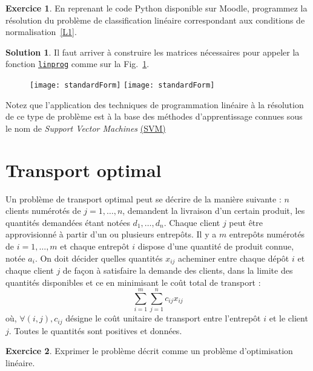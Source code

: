 \documentclass[a4paper,francais]{article}
\theoremstyle{definition}
\newtheorem{exercice}{Exercice}[section]
\newtheorem*{solution}{Solution}
\begin{document}
\begin{exercice}
  En reprenant le code Python disponible sur Moodle, programmez la résolution du problème
  de classification linéaire correspondant aux conditions de normalisation~\ref{L1}. 
\end{exercice}

\begin{solution}
  Il faut arriver à construire les matrices nécessaires pour appeler la fonction 
  \href{https://docs.scipy.org/doc/scipy-0.19.1/reference/optimize.linprog-simplex.html}{\texttt{linprog}} 
  comme sur la Fig.~\ref{fig:stdForm}. 
  
  \begin{figure}
  \centering
  \texttt{[image: standardForm]}
  \texttt{[image: standardForm]}
  \caption{}
  \label{fig:stdForm}
\end{figure}
\end{solution}

Notez que l'application des techniques de programmation linéaire à la résolution de ce type de problème
est à la base des méthodes d'apprentissage connues sous le nom de \emph{Support Vector Machines}
\href{https://en.wikipedia.org/wiki/Support-vector_machine}{(SVM)}

\section{Transport optimal}
\label{sec:transport}

Un problème de transport optimal peut se décrire de la manière suivante :
$n$ clients numérotés de $j = 1, \dots, n$, demandent la livraison d'un
certain produit, les quantités demandées étant notées $d_1, \dots, d_n$.
Chaque client $j$ peut être approvisionné à partir d'un ou plusieurs entrepôts.
Il y a $m$ entrepôts numérotés de $i = 1, \dots, m$ et chaque entrepôt $i$
dispose d'une quantité de produit connue, notée $a_i$. On doit décider quelles
quantités $x_{ij}$ acheminer entre chaque dépôt $i$ et chaque client $j$ de façon
à satisfaire la demande des clients, dans la limite des quantités disponibles
et ce en minimisant le coût total de transport :
\[
\sum_{i = 1}^m \sum_{j = 1}^{n} c_{ij}x_{ij}
\]
où, $\forall (i,j), c_{ij}$ désigne le coût unitaire de transport entre l'entrepôt
$i$ et le client $j$. Toutes le quantités sont positives et données.

\begin{exercice}
Exprimer le problème décrit comme un problème d'optimisation linéaire.%
\end{exercice}
\end{document}
